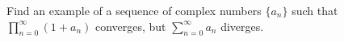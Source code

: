 Find an example of a sequence of complex numbers $\{a_n\}$ such that $\prod\limits_{n=0}^{\infty} (1 + a_n)$ converges, 
but $\sum\limits_{n=0}^{\infty} a_n$ diverges.

\begin{solution}
  \ \\
\end{solution}
